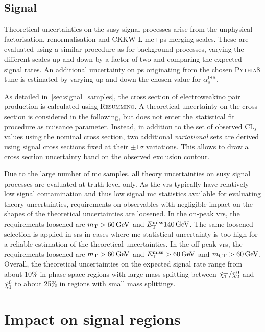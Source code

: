  \subsection{Signal}
 
 Theoretical uncertainties on the \gls{susy} signal processes arise from the unphysical factorisation, renormalisation and CKKW-L \gls{me}+\gls{ps} merging scales. These are evaluated using a similar procedure as for background processes, varying the different scales up and down by a factor of two and comparing the expected signal rates. An additional uncertainty on \gls{ps} originating from the chosen \textsc{Pythia8} tune is estimated by varying up and down the chosen value for $\alpha_s^\mathrm{ISR}$.    
 
 As detailed in~\cref{sec:signal_samples}, the cross section of electroweakino pair production is calculated using \textsc{Resummino}. A theoretical uncertainty on the cross section is considered in the following, but does not enter the statistical fit procedure as nuisance parameter. Instead, in addition to the set of observed CL$_s$ values using the nominal cross section, two additional \textit{variational} sets are derived using signal cross sections fixed at their $\pm 1\sigma$ variations. This allows to draw a cross section uncertainty band on the observed exclusion contour. 

Due to the large number of \gls{mc} samples, all theory uncertainties on \gls{susy} signal processes are evaluated at truth-level only.   As the \glspl{vr} typically have relatively low signal contamination and thus low signal \gls{mc} statistics available for evaluating theory uncertainties, requirements on observables with negligible impact on the shapes of the theoretical uncertainties are loosened. In the on-peak \glspl{vr}, the requirements loosened are $\mt>\SI{60}{\GeV}$ and $\etmiss\SI{140}{\GeV}$. The same loosened selection is applied in \glspl{sr} in cases where \gls{mc} statistical uncertainty is too high for a reliable estimation of the theoretical uncertainties. In the off-peak \glspl{vr}, the requirements loosened are $\mt>\SI{60}{\GeV}$ and $\etmiss>\SI{60}{\GeV}$ and $\mct>\SI{60}{\GeV}$. Overall, the theoretical uncertainties on the expected signal rate range from about 10\% in phase space regions with large mass splitting between $\tilde{\chi}_1^\pm/\tilde{\chi}_2^0$ and $\tilde{\chi}_1^0$ to about 25\% in regions with small mass splittings.
 
 
\section{Impact on signal regions}

